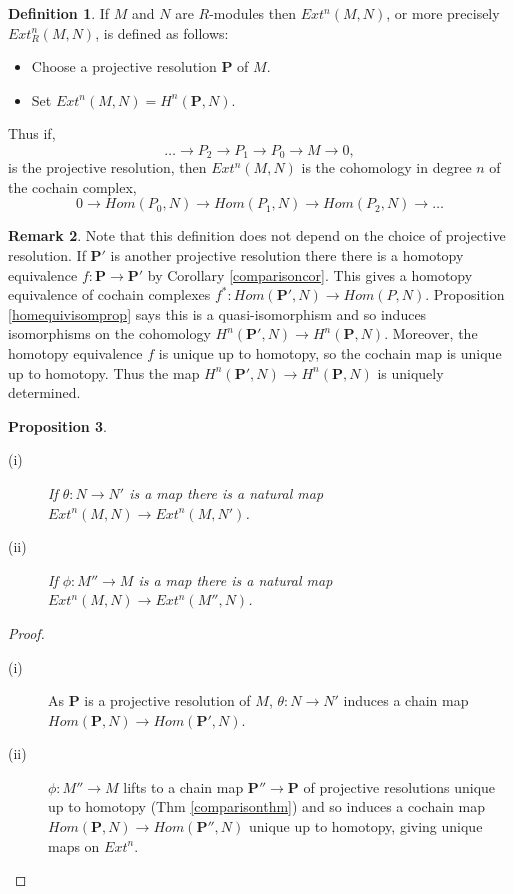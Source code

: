 \documentclass[11.5pt, twoside, a4paper, titlepage]{report}
\theoremstyle{definition}
\newtheorem{mydef}{Definition}[section]
\newtheorem{rem}[mydef]{Remark}
\theoremstyle{plain}
\newtheorem{prop}[mydef]{Proposition}
\begin{document}
\begin{mydef}
If $M$ and $N$ are $R$-modules then $Ext^n(M, N)$, or more precisely $Ext^n_R(M, N)$, is defined as follows:
\begin{itemize}
\item Choose a projective resolution $\mathbf{P}$ of $M$.
\item Set $Ext^n(M, N)=H^n(\mathbf{P}, N)$.
\end{itemize}
Thus if, 
\begin{equation*}
\dots \xrightarrow{}P_2 \xrightarrow{} P_1 \xrightarrow{} P_0 \xrightarrow{}M\xrightarrow{}0,
\end{equation*}
 is the projective resolution, then $Ext^n(M, N)$ is the cohomology in degree $n$ of the cochain complex,
\begin{equation*}
0\xrightarrow{} Hom(P_0, N) \xrightarrow{} Hom(P_1, N) \xrightarrow{} Hom(P_2, N)\xrightarrow{} \dots
\end{equation*}
\end{mydef}
 
\begin{rem}
Note that this definition does not depend on the choice of projective resolution. If $\mathbf{P'}$ is another projective resolution there there is a homotopy equivalence $f: \mathbf{P} \to \mathbf{P'}$ by Corollary \ref{comparisoncor}. This gives a homotopy equivalence of cochain complexes $f^{\ast}: Hom(\mathbf{P'}, N) \to Hom(P, N)$. Proposition \ref{homequivisomprop} says this is a quasi-isomorphism and so induces isomorphisms on the cohomology $H^n(\mathbf{P'}, N) \to H^n(\mathbf{P}, N)$.  Moreover, the homotopy equivalence $f$ is unique up to homotopy, so the cochain map is unique up to homotopy. Thus the map $H^n(\mathbf{P'}, N) \to H^n(\mathbf{P}, N)$ is uniquely determined.
\end{rem}

\begin{prop}
\begin{description}
\item [(i)] If $\theta: N \to N'$ is a map there is a natural map $ Ext^n(M, N) \to Ext^n(M, N')$.
\item[(ii)] If $\phi: M'' \to M$ is a map there is a natural map $ Ext^n(M, N) \to Ext^n(M'', N)$.
\end{description}
\end{prop}
\begin{proof}
\begin{description}
\item [(i)] As $\mathbf{P}$ is a projective resolution of $M$, $\theta: N \to N'$ induces a chain map $Hom(\mathbf{P}, N) \to Hom(\mathbf{P'}, N)$.
\item [(ii)] $\phi: M'' \to M$ lifts to a chain map $\mathbf{P''} \to \mathbf{P}$ of projective resolutions unique up to homotopy (Thm \ref{comparisonthm}) and so induces a cochain map $Hom(\mathbf{P}, N) \to Hom(\mathbf{P''}, N)$ unique up to homotopy, giving unique maps on $Ext^n$.
\end{description}
\end{proof}
\end{document}
